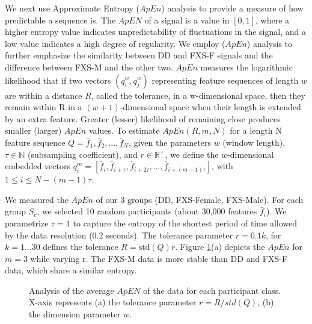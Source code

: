 \documentclass[10pt,twocolumn,letterpaper]{article}
\begin{document}
We next use Approximate Entropy ($ApEn$) analysis to provide a measure of how predictable a sequence is. The $ApEN$ of a signal is a value in $[0,1]$, where a higher entropy value indicates unpredictability of fluctuations in the signal, and a low value indicates a high degree of regularity. We employ ($ApEn$) analysis \cite{Restrepo:2014gs,entrophy} to further emphasize the similarity between DD and FXS-F signals and the difference between FXS-M and the other two. $ApEn$ measures the logarithmic likelihood that if two vectors $(q^{w}_{i}, q^{w}_{j})$ representing feature sequences of length $w$ are within a distance $R$, called the tolerance, in a w-dimensional space, then they remain within R in a $(w + 1)$-dimensional space when their length is extended by an extra feature. Greater (lesser) likelihood of remaining close produces smaller (larger) $ApEn$ values. To estimate $ApEn(R, m, N)$ for a length N feature sequence $Q={\bar{f}_1, \bar{f}_2, . . . , \bar{f}_{N}}$, given the parameters $w$ (window length), $\tau \in \mathbb{N}$ (subsampling coefficient), and $r \in \mathbb{R}^+$, we define the $w$-dimensional embedded vectors $q^{m}_{i}=[\bar{f}_{i}, \bar{f}_{i+\tau}, \bar{f}_{i+2\tau}, . . . , \bar{f}_{i+(m-1)\tau}]$, with $1 \leq i \leq N-(m-1)\tau$. 

We measured the $ApEn$ of our 3 groups (DD, FXS-Female, FXS-Male). For each group $S_c$, we selected 10 random participants (about 30,000 features $\bar{f}_i$). %
We parametrize $\tau=1$ to capture the entropy of the shortest period of time allowed by the data resolution (0.2 seconds). The tolerance parameter $r=0.1k$, for $k=1...30$ defines the tolerance $R = \text{std}(Q)r$. Figure \ref{fig:entropy}(a) depicts the $ApEn$ for $m=3$ while varying r. The FXS-M data is more stable than DD and FXS-F data, which share a similar entropy. 
\begin{figure}
            \hfill
       
        \caption{Analysis of the average $ApEN$ of the data for each participant class. X-axis represents (a) the tolerance parameter $r = R/std(Q)$, (b) the dimension parameter $w$.}
         \label{fig:entropy}
\end{figure}
\end{document}
